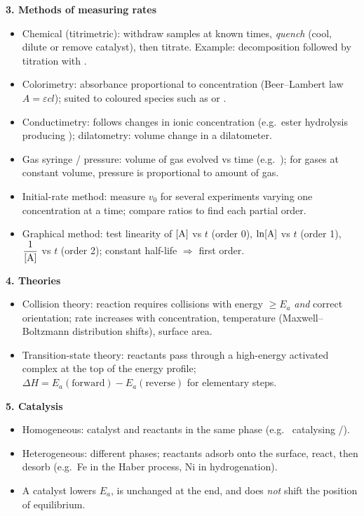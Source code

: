 \documentclass[11pt]{article}
\newcommand{\cle}[1]{{\popxbold\color{popdark}#1}}
\begin{document}
\begin{aretenir}
\textbf{3. Methods of measuring rates}
\begin{itemize}
\item \cle{Chemical (titrimetric)}: withdraw samples at known times, \emph{quench} (cool, dilute or remove catalyst), then titrate. Example:  decomposition followed by titration with .
\item \cle{Colorimetry}: absorbance proportional to concentration (Beer–Lambert law $A=\varepsilon cl$); suited to coloured species such as  or .
\item \cle{Conductimetry}: follows changes in ionic concentration (e.g.\ ester hydrolysis producing ); \cle{dilatometry}: volume change in a dilatometer.
\item \cle{Gas syringe / pressure}: volume of gas evolved vs time (e.g.\ ); for gases at constant volume, pressure is proportional to amount of gas.
\item \cle{Initial-rate method}: measure $v_0$ for several experiments varying one concentration at a time; compare ratios to find each partial order.
\item \cle{Graphical method}: test linearity of $[\ce{A}]$ vs $t$ (order 0), $\ln[\ce{A}]$ vs $t$ (order 1), $\dfrac{1}{[\ce{A}]}$ vs $t$ (order 2); constant half-life $\Rightarrow$ first order.
\end{itemize}

\textbf{4. Theories}
\begin{itemize}
\item \cle{Collision theory}: reaction requires collisions with energy $\geq E_a$ \emph{and} correct orientation; rate increases with concentration, temperature (Maxwell–Boltzmann distribution shifts), surface area.
\item \cle{Transition-state theory}: reactants pass through a high-energy \cle{activated complex} at the top of the energy profile; $\Delta H = E_a(\text{forward}) - E_a(\text{reverse})$ for elementary steps.
\end{itemize}

\textbf{5. Catalysis}
\begin{itemize}
\item \cle{Homogeneous}: catalyst and reactants in the same phase (e.g.\  catalysing /).
\item \cle{Heterogeneous}: different phases; reactants adsorb onto the surface, react, then desorb (e.g.\ Fe in the Haber process, Ni in hydrogenation).
\item A catalyst lowers $E_a$, is unchanged at the end, and does \emph{not} shift the position of equilibrium.
\end{itemize}


\end{aretenir}
\end{document}
